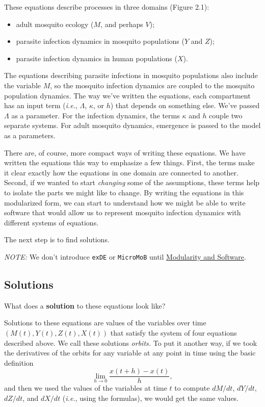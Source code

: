 \documentclass[
]{book}
\begin{document}
These equations describe processes in three domains (Figure 2.1):

\begin{itemize}
\item
  adult mosquito ecology (\(M\), and perhaps \(V\));
\item
  parasite infection dynamics in mosquito populations (\(Y\) and \(Z\));
\item
  parasite infection dynamics in human populations (\(X\)).
\end{itemize}

The equations describing parasite infections in mosquito populations also include the variable \(M\), so the mosquito infection dynamics are coupled to the mosquito population dynamics. The way we've written the equations, each compartment has an input term (\emph{i.e.}, \(\Lambda\), \(\kappa\), or \(h\)) that depends on something else. We've passed \(\Lambda\) as a parameter. For the infection dynamics, the terms \(\kappa\) and \(h\) couple two separate systems. For adult mosquito dynamics, emergence is passed to the model as a parameters.

There are, of course, more compact ways of writing these equations. We have written the equations this way to emphasize a few things. First, the terms make it clear exactly how the equations in one domain are connected to another. Second, if we wanted to start \emph{changing} some of the assumptions, these terms help to isolate the parts we might like to change. By writing the equations in this modularized form, we can start to understand how we might be able to write software that would allow us to represent mosquito infection dynamics with different systems of equations.

The next step is to find solutions.

\emph{NOTE:} We don't introduce \texttt{exDE} or \texttt{MicroMoB} until \hyperref[modularity-and-software]{Modularity and Software}.

\subsection{Solutions}\label{solutions}

What does a \textbf{solution} to these equations look like?

Solutions to these equations are values of the variables over time \(\left( M(t), Y(t), Z(t), X(t) \right)\) that satisfy the system of four equations described above. We call these solutions \emph{orbits.} To put it another way, if we took the derivatives of the orbits for any variable at any point in time using the basic definition \[\lim_{h\rightarrow 0} \frac{x(t+h)-x(t)}{h},\] and then we used the values of the variables at time \(t\) to compute \(dM/dt\), \(dY/dt\), \(dZ/dt\), and \(dX/dt\) (\emph{i.e.}, using the formulas), we would get the same values.
\end{document}
